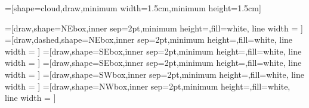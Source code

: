\makeatother

=[shape=cloud,draw,minimum width=1.5cm,minimum height=1.5cm]














=[draw,shape=NEbox,inner sep=2pt,minimum height=\mapminh,fill=white, line width = \maplw] %
=[draw,dashed,shape=NEbox,inner sep=2pt,minimum height=\mapminh,fill=white, line width = \maplw]
=[draw,shape=SEbox,inner sep=2pt,minimum height=\mapminh,fill=white, line width = \maplw]
=[draw,shape=SEbox,inner sep=2pt,minimum height=\mapminh,fill=white, line width = \maplw]
=[draw,shape=SWbox,inner sep=2pt,minimum height=\mapminh,fill=white, line width = \maplw]
=[draw,shape=NWbox,inner sep=2pt,minimum height=\mapminh,fill=white, line width = \maplw]


